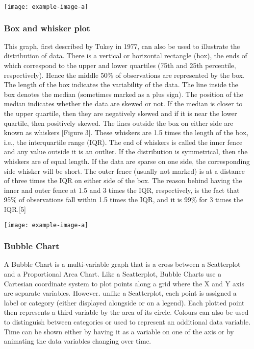 \texttt{[image: example-image-a]} 

\subsubsection{Box and whisker plot}
This graph, first described by Tukey in 1977, can also be
used to illustrate the distribution of data. There is a vertical
or horizontal rectangle (box), the ends of which correspond
to the upper and lower quartiles (75th and 25th percentile,
respectively). Hence the middle 50\% of observations are
represented by the box. The length of the box indicates the
variability of the data. The line inside the box denotes the
median (sometimes marked as a plus sign). The position of
the median indicates whether the data are skewed or not.
If the median is closer to the upper quartile, then they are
negatively skewed and if it is near the lower quartile, then
positively skewed.
The lines outside the box on either side are known as whiskers
[Figure 3]. These whiskers are 1.5 times the length of the
box, i.e., the interquartile range (IQR). The end of whiskers is
called the inner fence and any value outside it is an outlier. If
the distribution is symmetrical, then the whiskers are of equal
length. If the data are sparse on one side, the corresponding side
whisker will be short. The outer fence (usually not marked)
is at a distance of three times the IQR on either side of the
box. The reason behind having the inner and outer fence at
1.5 and 3 times the IQR, respectively, is the fact that 95\% of
observations fall within 1.5 times the IQR, and it is 99\% for
3 times the IQR.[5]

\texttt{[image: example-image-a]} 

\subsubsection{Bubble Chart}
A Bubble Chart is a multi-variable graph that is a cross between a Scatterplot 
and a Proportional Area Chart. Like a Scatterplot, Bubble Charts use a Cartesian 
coordinate system to plot points along a grid where the X and Y axis are separate 
variables. However. unlike a Scatterplot, each point is assigned a label or 
category (either displayed alongside or on a legend). Each plotted point then 
represents a third variable by the area of its circle. Colours can also be used 
to distinguish between categories or used to represent an additional data variable. 
Time can be shown either by having it as a variable on one of the axis or by 
animating the data variables changing over time.


